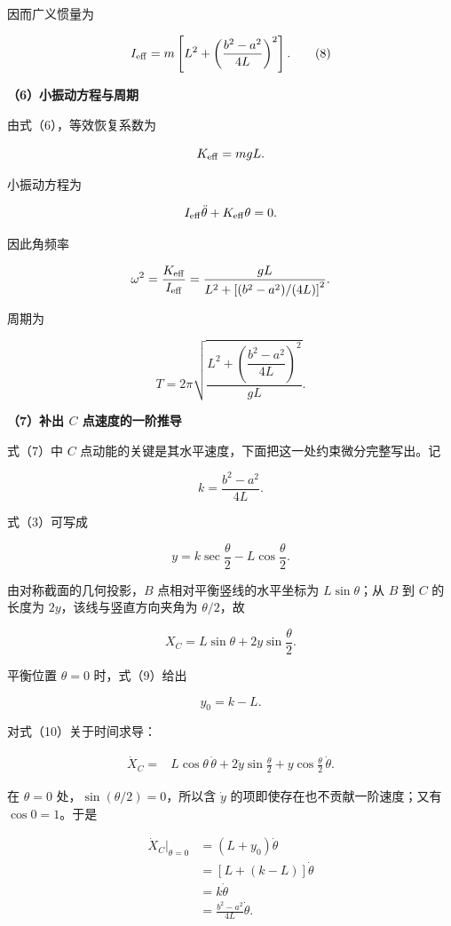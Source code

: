 \documentclass[12pt,a4paper,UTF8]{ctexart}
\begin{document}
因而广义惯量为

\[
I_{\rm eff}=m
\left[
L^2+\left(\frac{b^2-a^2}{4L}\right)^2
\right].\tag{8}
\]

\textbf{（6）小振动方程与周期}

由式（6），等效恢复系数为

\[
K_{\rm eff}=mgL.
\]

小振动方程为

\[
I_{\rm eff}\ddot\theta+K_{\rm eff}\theta=0.
\]

因此角频率

\[
\omega^2
=\frac{K_{\rm eff}}{I_{\rm eff}}
=\frac{gL}{L^2+\left[(b^2-a^2)/(4L)\right]^2}.
\]

周期为

\[
\boxed{
T=2\pi
\sqrt{
\frac{
L^2+\left(\dfrac{b^2-a^2}{4L}\right)^2
}{gL}}
}.
\]

\textbf{（7）补出 \(C\) 点速度的一阶推导}

式（7）中 \(C\)
点动能的关键是其水平速度，下面把这一处约束微分完整写出。记

\[
k=\frac{b^2-a^2}{4L}.
\]

式（3）可写成

\[
y=k\sec\frac\theta2-L\cos\frac\theta2.
\tag{9}
\]

由对称截面的几何投影，\(B\) 点相对平衡竖线的水平坐标为
\(L\sin\theta\)；从 \(B\) 到 \(C\) 的长度为 \(2y\)，该线与竖直方向夹角为
\(\theta/2\)，故

\[
X_C=L\sin\theta+2y\sin\frac\theta2.
\tag{10}
\]

平衡位置 \(\theta=0\) 时，式（9）给出

\[
y_0=k-L.
\tag{11}
\]

对式（10）关于时间求导：

\[
\begin{aligned}
\dot X_C
={}&L\cos\theta\,\dot\theta
+2\dot y\sin\frac\theta2
+y\cos\frac\theta2\,\dot\theta.
\end{aligned}
\tag{12}
\]

在 \(\theta=0\) 处，\(\sin(\theta/2)=0\)，所以含 \(\dot y\)
的项即使存在也不贡献一阶速度；又有 \(\cos0=1\)。于是

\[
\begin{aligned}
\dot X_C\big|_{\theta=0}
&=(L+y_0)\dot\theta\\
&=[L+(k-L)]\dot\theta\\
&=k\dot\theta\\
&=\frac{b^2-a^2}{4L}\dot\theta.
\end{aligned}
\tag{13}
\]
\end{document}
